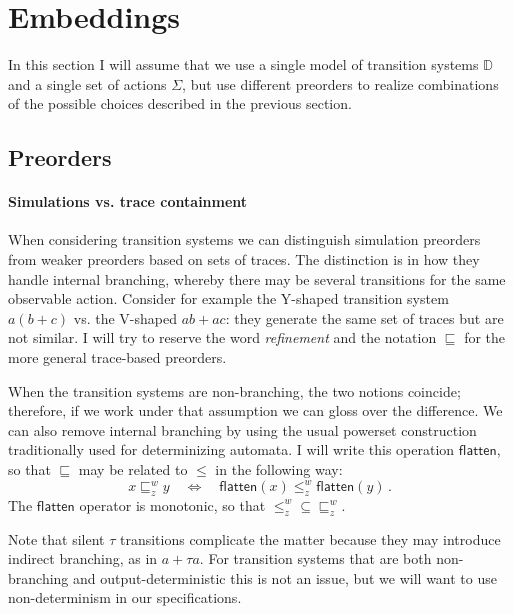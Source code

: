 \documentclass[11pt]{article}
\begin{document}


\section{Embeddings} %

In this section I will assume that we use
a single model of transition systems $\mathbb{D}$ and
a single set of actions $\Sigma$,
but use different preorders to
realize combinations of the possible choices
described in the previous section.

\subsection{Preorders} %

\paragraph{Simulations vs. trace containment} %

When considering transition systems
we can distinguish simulation preorders
from weaker preorders based on sets of traces.
The distinction is in how they handle internal branching,
whereby there may be several transitions for the same observable action.
Consider for example
the Y-shaped transition system $a(b + c)$ vs.
the V-shaped $ab + ac$:
they generate the same set of traces but are not similar.
I will try to reserve the word \emph{refinement}
and the notation $\sqsubseteq$
for the more general trace-based preorders.

When the transition systems are non-branching,
the two notions coincide;
therefore, if we work under that assumption
we can gloss over the difference.
We can also remove internal branching by using the usual
powerset construction traditionally used for determinizing automata.
I will write this operation $\mathsf{flatten}$,
so that $\sqsubseteq$ may be related to $\le$ in the following way:
\[ x \sqsubseteq^w_z y \quad \Leftrightarrow \quad
  \mathsf{flatten}(x) \le^w_z \mathsf{flatten}(y) \,. \]
The $\mathsf{flatten}$ operator is monotonic, so that
${\le}^w_z \subseteq {\sqsubseteq}^w_z$.

Note that silent $\tau$ transitions complicate the matter
because they may introduce indirect branching,
as in $a + \tau a$.
For transition systems that are both non-branching and output-deterministic
this is not an issue,
but we will want to use non-determinism in our specifications.
\end{document}
